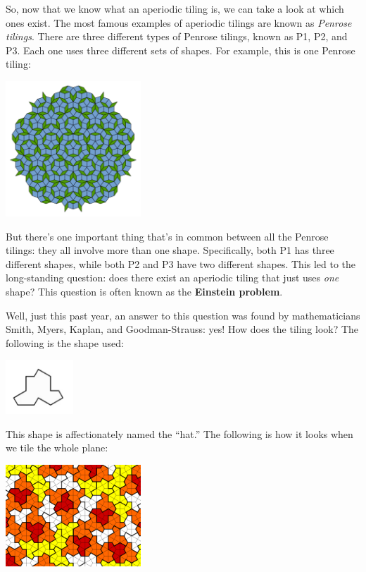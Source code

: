 \documentclass{article}
\begin{document}
So, now that we know what an aperiodic tiling is, we can take a look at which ones exist. The most famous examples of aperiodic tilings are known as \textit{Penrose tilings}. There are three different types of Penrose tilings, known as P1, P2, and P3. Each one uses three different sets of shapes. For example, this is one Penrose tiling:

\begin{center}
    \includegraphics[width=2in]{images/penrose.png}
\end{center}

But there's one important thing that's in common between all the Penrose tilings: they all involve more than one shape. Specifically, both P1 has three different shapes, while both P2 and P3 have two different shapes. This led to the long-standing question: does there exist an aperiodic tiling that just uses \textit{one} shape? This question is often known as the \textbf{Einstein problem}.

Well, just this past year, an answer to this question was found by mathematicians Smith, Myers, Kaplan, and Goodman-Strauss: yes! How does the tiling look? The following is the shape used:

\begin{center}
    \includegraphics[width=1in]{images/einsteintile.png}
\end{center}

This shape is affectionately named the ``hat.'' The following is how it looks when we tile the whole plane:

\begin{center}
    \includegraphics[width=2in]{images/einsteintiling.png}
\end{center}
\end{document}
